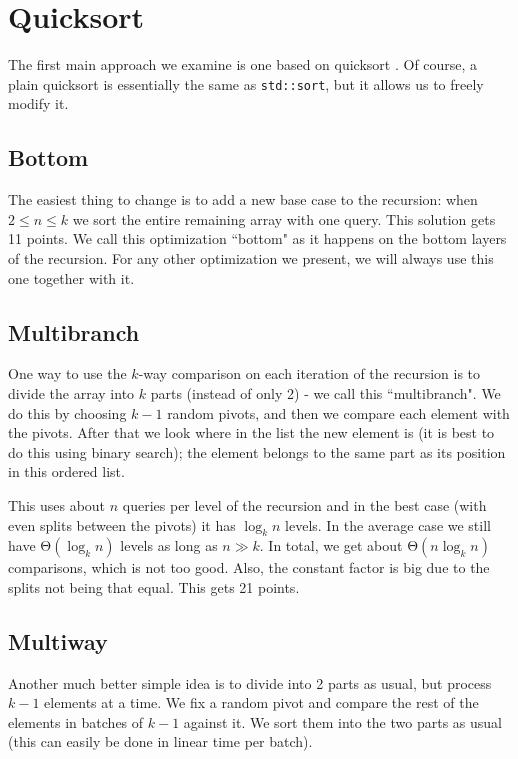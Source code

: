 \documentclass{article}
\begin{document}
\section{Quicksort}

The first main approach we examine is one based on quicksort \cite{quicksort}. Of course, a plain quicksort is essentially the same as \verb|std::sort|, but it allows us to freely modify it.

\subsection{Bottom}

The easiest thing to change is to add a new base case to the recursion: when $ 2 \leq n \leq k $ we sort the entire remaining array with one query. This solution gets 11 points. We call this optimization ``bottom" as it happens on the bottom layers of the recursion. For any other optimization we present, we will always use this one together with it.

\subsection{Multibranch}

One way to use the $k$-way comparison on each iteration of the recursion is to divide the array into $k$ parts (instead of only 2) - we call this ``multibranch". We do this by choosing $ k - 1 $ random pivots, and then we compare each element with the pivots. After that we look where in the list the new element is (it is best to do this using binary search); the element belongs to the same part as its position in this ordered list.

This uses about $ n $ queries per level of the recursion and in the best case (with even splits between the pivots) it has $ \log_k{n} $ levels. In the average case we still have $ \mathrm{\Theta}\left( \log_k {n} \right) $ levels as long as $ n \gg k $. In total, we get about $ \mathrm{\Theta}\left( n \log_k{n} \right) $ comparisons, which is not too good. Also, the constant factor is big due to the splits not being that equal. This gets 21 points.

\subsection{Multiway}

Another much better simple idea is to divide into 2 parts as usual, but process $ k - 1 $ elements at a time. We fix a random pivot and compare the rest of the elements in batches of $ k - 1 $ against it. We sort them into the two parts as usual (this can easily be done in linear time per batch).
\end{document}

